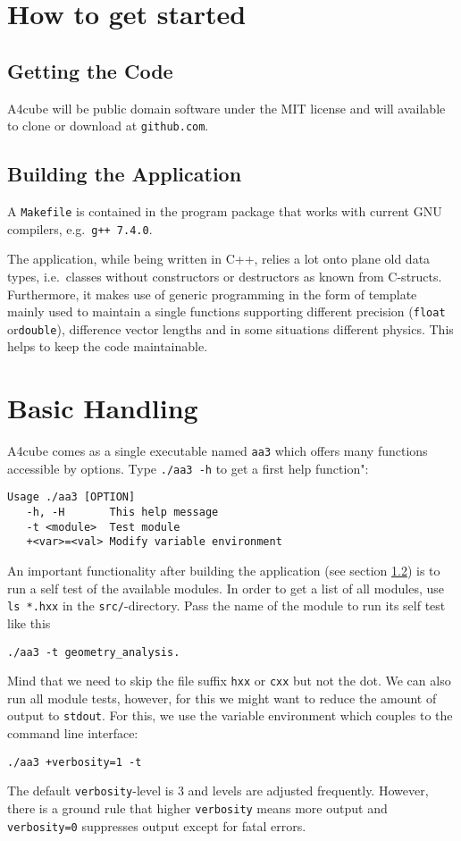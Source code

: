 \documentclass[oribibl]{llncs}
\newcommand{\ttt}[1]{\texttt{#1}}
\newcommand{\codename}{A4cube}
\begin{document}
\section{How to get started}

\subsection{Getting the Code}
\codename{} will be public domain software under the MIT license
and will available to clone or download at \ttt{github.com}. 

\subsection{Building the Application} \label{sec:compiling}
A \ttt{Makefile} is contained in the program package that works with current GNU compilers, e.g.~\ttt{g++ 7.4.0}.

The application, while being written in C++, relies a lot onto plane old data types, i.e.~classes without constructors or destructors as known from C-structs.
Furthermore, it makes use of generic programming in the form of template
mainly used to maintain a single functions supporting different precision (\ttt{float} or\ttt{double}), difference vector lengths and in some situations different physics. This helps to keep the code maintainable.

\section{Basic Handling}
\codename{} comes as a single executable named \ttt{aa3} which
offers many functions accessible by options. Type \ttt{./aa3 -h}
to get a first help function":
\begin{verbatim}
Usage ./aa3 [OPTION]
   -h, -H      	This help message
   -t <module> 	Test module
   +<var>=<val>	Modify variable environment
\end{verbatim}

An important functionality after building the application (see section \ref{sec:compiling}) is to run a self test of the available modules.
In order to get a list of all modules, 
use \ttt{ls *.hxx} in the \ttt{src/}-directory.
Pass the name of the module to run its self test like this
\begin{verbatim}
./aa3 -t geometry_analysis.
\end{verbatim}
Mind that we need to skip the file suffix \ttt{hxx} or \ttt{cxx} but not the dot.
We can also run all module tests, however, for this we might want to reduce
the amount of output to \ttt{stdout}. For this, we use the variable environment
which couples to the command line interface:
\begin{verbatim}
./aa3 +verbosity=1 -t
\end{verbatim}
The default \ttt{verbosity}-level is $3$ and levels are adjusted frequently.
However, there is a ground rule that higher \ttt{verbosity} means more output
and \ttt{verbosity=0} suppresses output except for fatal errors.
\end{document}
